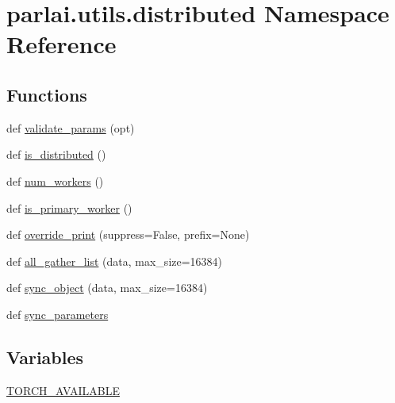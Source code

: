 \hypertarget{namespaceparlai_1_1utils_1_1distributed}{}\section{parlai.\+utils.\+distributed Namespace Reference}
\label{namespaceparlai_1_1utils_1_1distributed}
\subsection*{Functions}
\begin{DoxyCompactItemize}
\item 
def \hyperlink{namespaceparlai_1_1utils_1_1distributed_afd854992e4cc6571b120b9e179cd4a7a}{validate\+\_\+params} (opt)
\item 
def \hyperlink{namespaceparlai_1_1utils_1_1distributed_a023acb5e3b66e1f27e21247c35661279}{is\+\_\+distributed} ()
\item 
def \hyperlink{namespaceparlai_1_1utils_1_1distributed_a99b61b4756577c6542039c238d670dba}{num\+\_\+workers} ()
\item 
def \hyperlink{namespaceparlai_1_1utils_1_1distributed_a9bb1dac198180590ef8c6b6c6f9fc2c4}{is\+\_\+primary\+\_\+worker} ()
\item 
def \hyperlink{namespaceparlai_1_1utils_1_1distributed_a601345e55fc3fc3845c43efa1a04db56}{override\+\_\+print} (suppress=False, prefix=None)
\item 
def \hyperlink{namespaceparlai_1_1utils_1_1distributed_a9ef5bf0debf512ddbeb045327bfd87ef}{all\+\_\+gather\+\_\+list} (data, max\+\_\+size=16384)
\item 
def \hyperlink{namespaceparlai_1_1utils_1_1distributed_a269d3c7284127d9b287b9b61e9161de6}{sync\+\_\+object} (data, max\+\_\+size=16384)
\item 
def \hyperlink{namespaceparlai_1_1utils_1_1distributed_a47e6d93d849e487d7d3f6e1a83468073}{sync\+\_\+parameters}
\end{DoxyCompactItemize}
\subsection*{Variables}
\begin{DoxyCompactItemize}
\item 
\hyperlink{namespaceparlai_1_1utils_1_1distributed_af99c57e9c67ff88f4802625436fc2c6c}{T\+O\+R\+C\+H\+\_\+\+A\+V\+A\+I\+L\+A\+B\+LE}
\end{DoxyCompactItemize}



